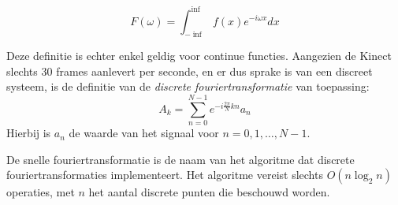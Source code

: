 $$F(\omega) = \int_{-\inf}^{\inf}f(x)e^{-i\omega x} dx$$

Deze definitie is echter enkel geldig voor continue functies. Aangezien de Kinect slechts 30 frames aanlevert per seconde, en er dus sprake is van een discreet systeem, is de definitie van de \textit{discrete fouriertransformatie} van toepassing:
$$A_k = \sum_{n=0}^{N-1}e^{-i\frac{2\pi}{N}kn}a_n$$
Hierbij is $a_n$ de waarde van het signaal voor $n = 0, 1, \dots, N - 1$.



De snelle fouriertransformatie \cite{Cooley1965} is de naam van het algoritme dat discrete fouriertransformaties implementeert. Het algoritme vereist slechts $O(n\log_2 n)$ operaties, met $n$ het aantal discrete punten die beschouwd worden. 




















